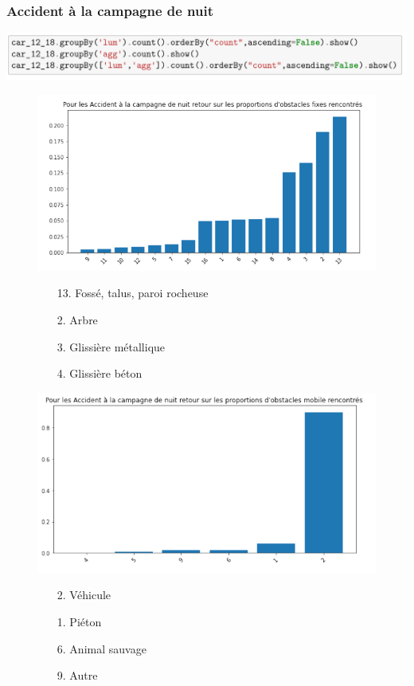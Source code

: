 \documentclass{beamer}
\theoremstyle{definition}
\begin{document}
\begin{frame}
	\frametitle{Accident à la campagne de nuit}
	
	\begin{minipage}[t]{1\linewidth}
		\centering
		\includegraphics[width=1\linewidth]{lum0.png}\\[-0.25cm]
		\begin{minipage}[t]{0.48\linewidth}\centering\begin{figure}
				\raggedright
				\includegraphics[width=1\linewidth]{camp1.png}
				\begin{enumerate}
					\item[13.] Fossé, talus, paroi rocheuse
					\item[2.] Arbre
					\item[3.] Glissière métallique
					\item[4.] Glissière béton
				\end{enumerate}
		\end{figure}\end{minipage}\hfil 
		\begin{minipage}[t]{0.48\linewidth}\centering\begin{figure}
				\raggedright
				\includegraphics[width=1\linewidth]{camp2.png}
				\begin{enumerate}
					\item[2.] Véhicule
					\item[1.] Piéton
					\item[6.] Animal sauvage
					\item[9.] Autre
				\end{enumerate}		
				

\end{figure}
\end{minipage}
\end{minipage}
\end{frame}
\end{document}

